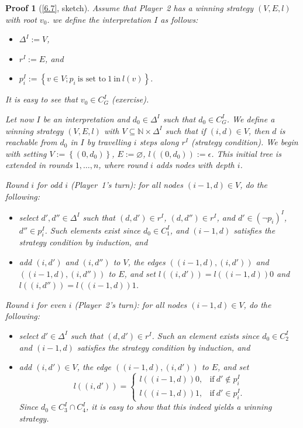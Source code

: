 \documentclass[openany]{scrbook}
\theoremstyle{break}
\theoremstyle{nonumberbreak}
\theoremstyle{nonumberplain}
\theoremstyle{nonumberbreak}
\newtheorem{Proof}{Proof}
\newcommand{\N}{\mathbb{N}}
\newcommand{\set}[1]{\left\{#1\right\}}
\begin{document}
\begin{Proof}[\cref{6.7}, sketch]
  Assume that Player~2 has a winning strategy $(V, E, l)$ with root
  $v_0$. we define the interpretation $I$ as follows:
  \begin{itemize}
  \item $\Delta^I := V$,
  \item $r^I := E$, and
  \item $p_i^I := \set{v \in V; p_i\ \text{is set to}\ 1\ \text{in}\ l(v)}$.
  \end{itemize}
  It is easy to see that $v_0 \in C_G^I$ (exercise).

  Let now $I$ be an interpretation and $d_0 \in \Delta^I$ such that
  $d_0 \in C_G^I$. We define a winning strategy $(V, E, l)$ with $V
  \subseteq \N \times \Delta^I$ such that if $(i, d) \in V$, then $d$
  is reachable from $d_0$ in $I$ by travelling $i$ steps along $r^I$
  (strategy condition).
  We begin with setting $V := \set{(0, d_0)}$, $E := \varnothing$,
  $l((0, d_0)) := \epsilon$.  This initial tree is extended in rounds
  $1, \dotsc, n$, where round $i$ adds nodes with depth $i$.

  Round $i$ for odd $i$ (Player~1's turn): for all nodes $(i - 1, d)
  \in V$, do the following:
  \begin{itemize}
  \item select $d', d'' \in \Delta^I$ such that $(d, d') \in r^I$,
    $(d, d'') \in r^I$, and $d' \in (\neg p_i)^I$, $d'' \in
    p_i^I$. Such elements exist since $d_0 \in C_1^I$, and $(i - 1,
    d)$ satisfies the strategy condition by induction, and
  \item add $(i, d')$ and $(i, d'')$ to $V$, the edges $((i - 1, d),
    (i, d'))$ and $((i - 1, d), (i, d''))$ to $E$, and set $l((i, d'))
    = l((i - 1, d))0$ and $l((i, d'')) = l((i - 1, d))1$.
  \end{itemize}

  Round $i$ for even $i$ (Player~2's turn): for all nodes $(i - 1, d)
  \in V$, do the following:
  \begin{itemize}
  \item select $d' \in \Delta^I$ such that $(d, d') \in r^I$. Such an
    element exists since $d_0 \in C_2^I$ and $(i - 1, d)$ satisfies
    the strategy condition by induction, and
  \item add $(i, d') \in V$, the edge $((i - 1, d), (i, d'))$ to $E$,
    and set
    \begin{equation*}
      l((i, d')) = \begin{cases} l((i - 1, d))0, & \text{if}\ d'
          \not\in p_i^I \\
          l((i - 1, d))1, & \text{if}\ d' \in p_i^I.
        \end{cases}
    \end{equation*}
    Since $d_0 \in C_3^I \cap C_4^I$, it is easy to show that this
    indeed yields a winning strategy.
  \end{itemize}
\end{Proof}
\end{document}
